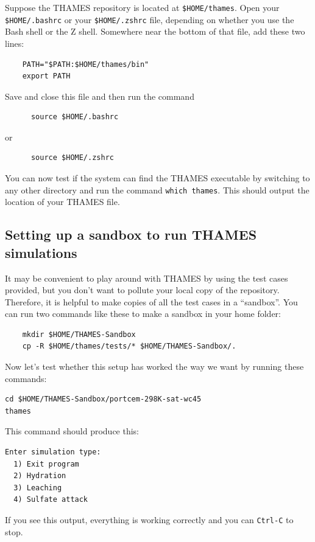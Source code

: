 \documentclass{article}
\begin{document}
\parspace
\begin{example}
	Suppose the THAMES repository is located at \verb|$HOME/thames|. Open
	your \verb|$HOME/.bashrc| or your \verb|$HOME/.zshrc| file, depending
	on whether you use the Bash shell or the Z shell. Somewhere near the bottom
	of that file, add these two lines:
	\small{
		\begin{verbatim}
    PATH="$PATH:$HOME/thames/bin"
    export PATH
  \end{verbatim}
	} \normalsize
	Save and close this file and then run the command
	\small{
		\begin{verbatim}
      source $HOME/.bashrc
  \end{verbatim}
	} \normalsize
	or
	\small{
		\begin{verbatim}
      source $HOME/.zshrc
  \end{verbatim}
	} \normalsize
	You can now test if the system can find the THAMES executable by switching to
	any other directory and run the command \verb|which thames|. This should output
	the location of your THAMES file.
\end{example}

\subsection*{Setting up a sandbox to run THAMES simulations}
It may be convenient to play around with THAMES by using the test cases
provided, but you don't want to pollute your local copy of the repository. Therefore,
it is helpful to make copies of all the test cases in a ``sandbox''. You can
run two commands like these to make a sandbox in your home folder:
\small{
	\begin{verbatim}
    mkdir $HOME/THAMES-Sandbox
    cp -R $HOME/thames/tests/* $HOME/THAMES-Sandbox/.
    \end{verbatim}
} \normalsize
Now let's test whether this setup has worked the way we want by running these
commands:
\small{
	\begin{verbatim}
cd $HOME/THAMES-Sandbox/portcem-298K-sat-wc45
thames
\end{verbatim}
} \normalsize
This command should produce this:
\small{
	\begin{verbatim}
Enter simulation type:
  1) Exit program
  2) Hydration
  3) Leaching
  4) Sulfate attack
\end{verbatim}
} \normalsize
If you see this output, everything is working correctly and you can
\verb|Ctrl-C| to stop.
\end{document}
